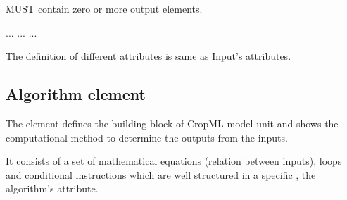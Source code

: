\documentclass[letterpaper,13pt,english]{sphinxmanual}
\begin{document}
 MUST contain zero or more output elements.

%
\begin{sphinxVerbatim}[commandchars=\\\{\}]
    
   ...
              
              
      ...
   ...
\end{sphinxVerbatim}

\begin{DUlineblock}{0em}
\item[] The definition of different attributes is same as Input’s attributes.
\end{DUlineblock}


\subsection{Algorithm element}
\label{\detokenize{user/description:algorithm-element}}
\begin{DUlineblock}{0em}
\item[] The  element defines the building block of CropML model unit and shows the computational method to determine
the outputs from the inputs.
\item[] It consists of a set of mathematical equations (relation between inputs), loops and conditional instructions
which are well structured in a specific , the algorithm’s attribute.
\end{DUlineblock}
\end{document}
